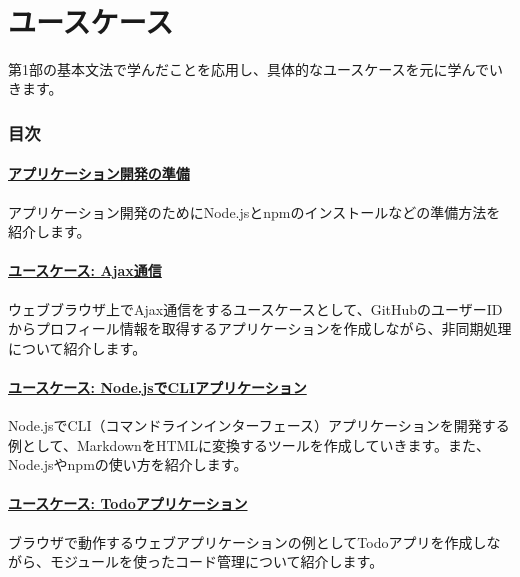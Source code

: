 \newpage
　
\newpage
\hypertarget{use-case}{%
\part{ユースケース}\label{use-case}}

第1部の基本文法で学んだことを応用し、具体的なユースケースを元に学んでいきます。

\hypertarget{summary}{%
\section*{目次}\label{summary}}

\subsection*{\texorpdfstring{\hyperlink{setup-local-env}{アプリケーション開発の準備}}{アプリケーション開発の準備}}

アプリケーション開発のためにNode.jsとnpmのインストールなどの準備方法を紹介します。

\subsection*{\texorpdfstring{\hyperlink{usecase-ajax}{ユースケース: Ajax通信}}{ユースケース: Ajax通信}}

ウェブブラウザ上でAjax通信をするユースケースとして、GitHubのユーザーIDからプロフィール情報を取得するアプリケーションを作成しながら、非同期処理について紹介します。

\subsection*{\texorpdfstring{\hyperlink{node-cli}{ユースケース: Node.jsでCLIアプリケーション}}{ユースケース: Node.jsでCLIアプリケーション}}

Node.jsでCLI（コマンドラインインターフェース）アプリケーションを開発する例として、MarkdownをHTMLに変換するツールを作成していきます。また、Node.jsやnpmの使い方を紹介します。

\subsection*{\texorpdfstring{\hyperlink{todo-app}{ユースケース: Todoアプリケーション}}{ユースケース: Todoアプリケーション}}

ブラウザで動作するウェブアプリケーションの例としてTodoアプリを作成しながら、モジュールを使ったコード管理について紹介します。

